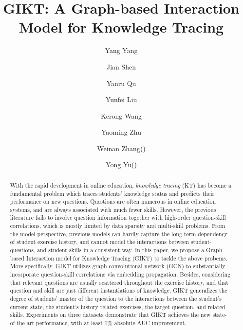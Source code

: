 \documentclass[runningheads]{llncs}
\begin{document}
\title{GIKT: A Graph-based Interaction Model for Knowledge Tracing}
	




	\author{Yang Yang \and
		Jian Shen \and
		Yanru Qu\and Yunfei Liu \and Kerong Wang\and Yaoming Zhu\and Weinan Zhang(\Letter) \and Yong Yu(\Letter)}


	
	\maketitle              \begin{abstract}
	With the rapid development in online education, \textit{knowledge tracing} (KT) has become a fundamental problem which traces students' knowledge status and predicts their performance on new questions. Questions are often numerous in online education systems, and are always associated with much fewer skills. However, the previous literature fails to involve question information together with high-order question-skill correlations, which is mostly limited by data sparsity and multi-skill problems. From the model perspective, previous models can hardly capture the long-term dependency of student exercise history, and cannot model the interactions between student-questions, and student-skills in a consistent way. In this paper, we propose a Graph-based Interaction model for Knowledge Tracing (GIKT) to tackle the above probems. More specifically, GIKT utilizes graph convolutional network (GCN) to substantially incorporate question-skill correlations via embedding propagation. Besides, considering that relevant questions are usually scattered throughout the exercise history, and that question and skill are just different instantiations of knowledge, GIKT generalizes the degree of students' master of the question to the interactions between the student's current state, the student's history related exercises, the target question, and related skills. Experiments on three datasets demonstrate that GIKT achieves the new state-of-the-art performance, with at least 1\% absolute AUC improvement.
	
	
\end{abstract}
\end{document}
